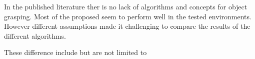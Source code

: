 In the published literature ther is no lack of algorithms and concepts for object grasping.
Most of the proposed seem to perform well in the tested environments.
However different assumptions made it challenging to compare the results of the different algorithms.


These difference include but are not limited to
